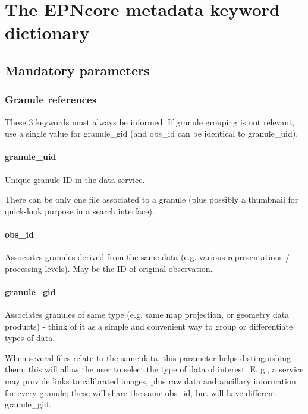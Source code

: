 \documentclass[11pt,a4paper]{ivoa}
\begin{document}
\section{The EPNcore metadata keyword dictionary} 


\subsection{Mandatory parameters}

\subsubsection{Granule references}

These 3 keywords must always be informed. If granule grouping is not relevant, use a single value for granule\_gid (and obs\_id can be identical to granule\_uid).

\paragraph{granule\_uid}

Unique granule ID in the data service.

There can be only one file associated to a granule (plus possibly a thumbnail for quick-look purpose in a search interface).

\paragraph{obs\_id}

Associates granules derived from the same data (e.g. various representations / processing levels). May be the ID of original observation.

\paragraph{granule\_gid}

Associates granules of same type (e.g. same map projection, or geometry data products) - think of it as a simple and convenient way to group or differentiate types of data.

When several files relate to the same data, this parameter helps distinguishing them: this will allow the user to select the type of data of interest. E. g., a service may provide links to calibrated images, plus raw data and ancillary information for every granule; these will share the same obs\_id, but will have different granule\_gid.
\end{document}
